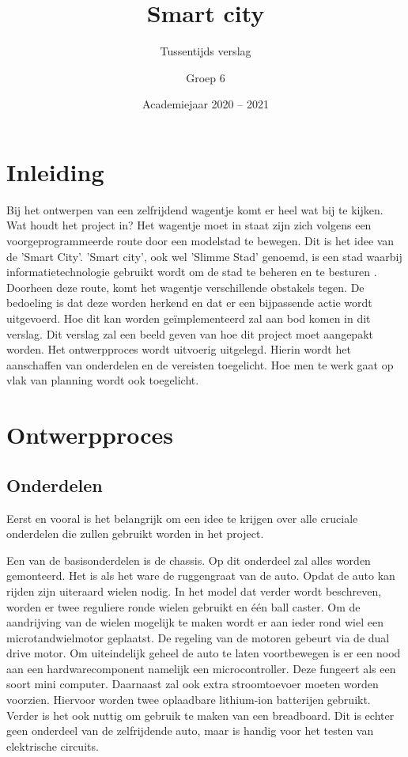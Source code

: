 \documentclass[a4paper,twoside,kulak]{kulakreport} %
\title{Smart city}
\subtitle{Tussentijds verslag}
\author{Groep 6}
\institute{Aaron Vandenberghe, Dieter Demuynck, Mathis Bossuyt, Rani Jans, Sarah De Meester, Jolien Barbier}
\date{Academiejaar 2020 -- 2021}
\begin{document}

\titlepage

\tableofcontents
\renewcommand\thesection{\arabic{section}}
\renewcommand\thesubsection{\thesection.\arabic{subsection}}
\newpage
\section*{Inleiding}

Bij het ontwerpen van een zelfrijdend wagentje komt er heel wat bij te kijken. Wat houdt het project in? Het wagentje moet in staat zijn zich volgens een voorgeprogrammeerde route door een modelstad te bewegen. Dit is het idee van de 'Smart City'. 'Smart city', ook wel 'Slimme Stad' genoemd, is een stad waarbij informatietechnologie gebruikt wordt om de stad te beheren en te besturen \cite{SmartCity}. Doorheen deze route, komt het wagentje verschillende obstakels tegen. De bedoeling is dat deze worden herkend en dat er een bijpassende actie wordt uitgevoerd. Hoe dit kan worden geïmplementeerd zal aan bod komen in dit verslag.
Dit verslag zal een beeld geven van hoe dit project moet aangepakt worden. Het ontwerpproces wordt uitvoerig uitgelegd. Hierin wordt het aanschaffen van onderdelen en de vereisten toegelicht. Hoe men te werk gaat op vlak van planning wordt ook toegelicht.

\section{Ontwerpproces}

\subsection{Onderdelen}

Eerst en vooral is het belangrijk om een idee te krijgen over alle cruciale onderdelen die zullen gebruikt worden in het project. 

Een van de basisonderdelen is de chassis. Op dit onderdeel zal alles worden gemonteerd. Het is als het ware de ruggengraat van de auto.%
Opdat de auto kan rijden zijn uiteraard wielen nodig. In het model dat verder wordt beschreven, worden er twee reguliere ronde wielen gebruikt en één ball caster. Om de aandrijving van de wielen mogelijk te maken wordt er aan ieder rond wiel een microtandwielmotor geplaatst. De regeling van de motoren gebeurt via de dual drive motor. Om uiteindelijk geheel de auto te laten voortbewegen is er een nood aan een hardwarecomponent namelijk een microcontroller. Deze fungeert als een soort mini computer. Daarnaast zal ook extra stroomtoevoer moeten worden voorzien. Hiervoor worden twee oplaadbare lithium-ion batterijen gebruikt. Verder is het ook nuttig om gebruik te maken van een breadboard. Dit is echter geen onderdeel van de zelfrijdende auto, maar is handig voor het testen van elektrische circuits.
\end{document}
